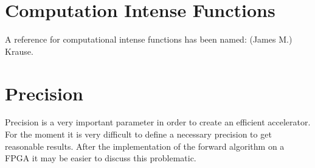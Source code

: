 \documentclass[paper=a4, fontsize=11pt]{scrartcl} %
\begin{document}
\section{Computation Intense Functions}
A reference for computational intense functions has been named: (James M.)
Krause.

\section{Precision}
Precision is a very important parameter in order to create an efficient
accelerator. For the moment it is very difficult to define a necessary
precision to get reasonable results. After the implementation of the forward
algorithm on a FPGA it may be easier to discuss this problematic.



\end{document}
